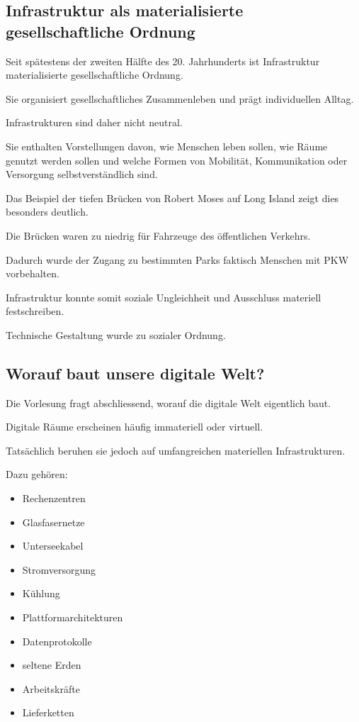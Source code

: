 \subsection{Infrastruktur als materialisierte gesellschaftliche Ordnung}

Seit spätestens der zweiten Hälfte
des 20. Jahrhunderts
ist Infrastruktur materialisierte
gesellschaftliche Ordnung.

Sie organisiert gesellschaftliches Zusammenleben
und prägt individuellen Alltag.

Infrastrukturen sind daher nicht neutral.

Sie enthalten Vorstellungen davon,
wie Menschen leben sollen,
wie Räume genutzt werden sollen
und welche Formen von Mobilität,
Kommunikation
oder Versorgung selbstverständlich sind.

Das Beispiel der tiefen Brücken
von Robert Moses auf Long Island zeigt dies besonders deutlich.

Die Brücken waren zu niedrig
für Fahrzeuge des öffentlichen Verkehrs.

Dadurch wurde der Zugang zu bestimmten Parks
faktisch Menschen mit PKW vorbehalten.

Infrastruktur konnte somit soziale Ungleichheit
und Ausschluss materiell festschreiben.

Technische Gestaltung
wurde zu sozialer Ordnung.

\subsection{Worauf baut unsere digitale Welt?}

Die Vorlesung fragt abschliessend,
worauf die digitale Welt eigentlich baut.

Digitale Räume erscheinen häufig immateriell
oder virtuell.

Tatsächlich beruhen sie jedoch
auf umfangreichen materiellen Infrastrukturen.

Dazu gehören:

\begin{itemize}
\item Rechenzentren
\item Glasfasernetze
\item Unterseekabel
\item Stromversorgung
\item Kühlung
\item Plattformarchitekturen
\item Datenprotokolle
\item seltene Erden
\item Arbeitskräfte
\item Lieferketten
\end{itemize}

